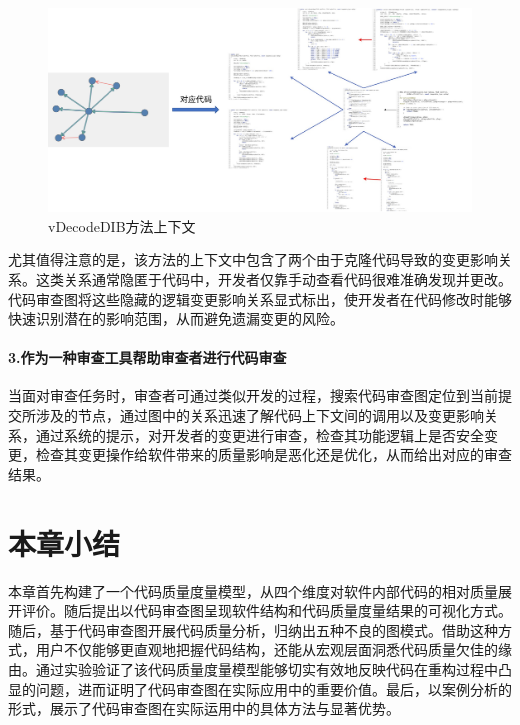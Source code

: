 \begin{figure}[h]
\centering
\includegraphics[width = 1\textwidth]{figures/3_助读示意.png}
\caption{vDecodeDIB方法上下文}
\end{figure}

尤其值得注意的是，该方法的上下文中包含了两个由于克隆代码导致的变更影响关系。这类关系通常隐匿于代码中，开发者仅靠手动查看代码很难准确发现并更改。代码审查图将这些隐藏的逻辑变更影响关系显式标出，使开发者在代码修改时能够快速识别潜在的影响范围，从而避免遗漏变更的风险。

\paragraph{3.作为一种审查工具帮助审查者进行代码审查} 当面对审查任务时，审查者可通过类似开发的过程，搜索代码审查图定位到当前提交所涉及的节点，通过图中的关系迅速了解代码上下文间的调用以及变更影响关系，通过系统的提示，对开发者的变更进行审查，检查其功能逻辑上是否安全变更，检查其变更操作给软件带来的质量影响是恶化还是优化，从而给出对应的审查结果。

\section{本章小结}

本章首先构建了一个代码质量度量模型，从四个维度对软件内部代码的相对质量展开评价。随后提出以代码审查图呈现软件结构和代码质量度量结果的可视化方式。随后，基于代码审查图开展代码质量分析，归纳出五种不良的图模式。借助这种方式，用户不仅能够更直观地把握代码结构，还能从宏观层面洞悉代码质量欠佳的缘由。通过实验验证了该代码质量度量模型能够切实有效地反映代码在重构过程中凸显的问题，进而证明了代码审查图在实际应用中的重要价值。最后，以案例分析的形式，展示了代码审查图在实际运用中的具体方法与显著优势。 
